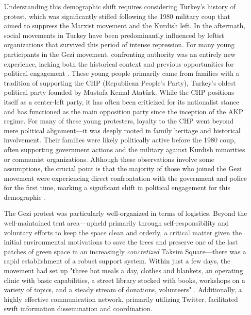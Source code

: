 Understanding this demographic shift requires considering Turkey’s history of protest, which was significantly stifled following the 1980 military coup that aimed to suppress the Marxist movement and the Kurdish left. In the aftermath, social movements in Turkey have been predominantly influenced by leftist organizations that survived this period of intense repression. For many young participants in the Gezi movement, confronting authority was an entirely new experience, lacking both the historical context and previous opportunities for political engagement \parencite[see 71-73]{tufekci2020}. These young people primarily came from families with a tradition of supporting the CHP (Republican People's Party), Turkey’s oldest political party founded by Mustafa Kemal Atatürk. While the CHP positions itself as a center-left party, it has often been criticized for its nationalist stance and has functioned as the main opposition party since the inception of the AKP regime. For many of these young protesters, loyalty to the CHP went beyond mere political alignment—it was deeply rooted in family heritage and historical involvement. Their families were likely politically active before the 1980 coup, often supporting government actions and the military against Kurdish minorities or communist organizations. Although these observations involve some assumptions, the crucial point is that the majority of those who joined the Gezi movement were experiencing direct confrontation with the government and police for the first time, marking a significant shift in political engagement for this demographic .

The Gezi protest was particularly well-organized in terms of logistics. Beyond the well-maintained tent area—upheld primarily through self-responsibility and voluntary efforts to keep the space clean and orderly, a critical matter given the initial environmental motivations to save the trees and preserve one of the last patches of green space in an increasingly \textit{concretized} Taksim Square—there was a rapid establishment of a robust support system. Within just a few days, the movement had set up "three hot meals a day, clothes and blankets, an operating clinic with basic capabilities, a street library stocked with books, workshops on a variety of topics, and a steady stream of donations, volunteers" \parencite[51]{tufekci2020}. Additionally, a highly effective communication network, primarily utilizing Twitter, facilitated swift information dissemination and coordination.

